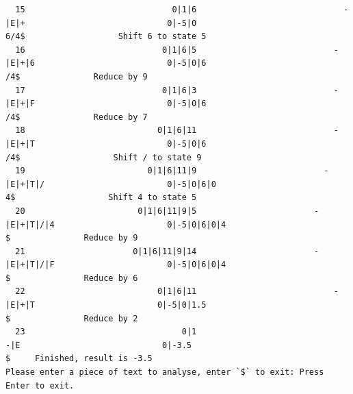\documentclass[UTF8]{ctexart}
\begin{document}
\begin{lstlisting}
  15                              0|1|6                              -|E|+                             0|-5|0                               6/4$                   Shift 6 to state 5
  16                            0|1|6|5                            -|E|+|6                           0|-5|0|6                                /4$               Reduce by 9
  17                            0|1|6|3                            -|E|+|F                           0|-5|0|6                                /4$               Reduce by 7
  18                           0|1|6|11                            -|E|+|T                           0|-5|0|6                                /4$                   Shift / to state 9
  19                         0|1|6|11|9                          -|E|+|T|/                         0|-5|0|6|0                                 4$                   Shift 4 to state 5
  20                       0|1|6|11|9|5                        -|E|+|T|/|4                       0|-5|0|6|0|4                                  $               Reduce by 9
  21                      0|1|6|11|9|14                        -|E|+|T|/|F                       0|-5|0|6|0|4                                  $               Reduce by 6
  22                           0|1|6|11                            -|E|+|T                         0|-5|0|1.5                                  $               Reduce by 2
  23                                0|1                                -|E                             0|-3.5                                  $     Finished, result is -3.5
Please enter a piece of text to analyse, enter `$` to exit: Press Enter to exit.
    \end{lstlisting}
\end{document}
